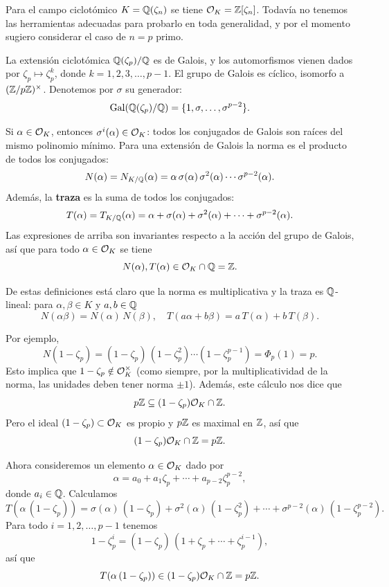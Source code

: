 \begin{ejemplo}
  Para el campo ciclotómico $K = \mathbb{Q} (\zeta_n)$ se tiene $\mathcal{O}_K = \mathbb{Z} [\zeta_n]$.
  Todavía no tenemos las herramientas adecuadas para probarlo en toda
  generalidad, y por el momento sugiero considerar el caso de $n = p$ primo.

  La extensión ciclotómica $\mathbb{Q} (\zeta_p)/\mathbb{Q}$ es de Galois, y los automorfismos
  vienen dados por $\zeta_p \mapsto \zeta_p^k$, donde $k = 1,2,3,\ldots,p-1$.
  El grupo de Galois es cíclico, isomorfo a $(\mathbb{Z}/p\mathbb{Z})^\times$. Denotemos por
  $\sigma$ su generador:
  $$\operatorname{Gal} (\mathbb{Q} (\zeta_p)/\mathbb{Q}) = \{ 1, \sigma, \ldots, \sigma^{p-2} \}.$$

  Si $\alpha \in \mathcal{O}_K$, entonces $\sigma^i (\alpha) \in \mathcal{O}_K$: todos los
  conjugados de Galois son raíces del mismo polinomio mínimo. Para una extensión
  de Galois la norma es el producto de todos los conjugados:
  \[ N (\alpha) = N_{K/\mathbb{Q}} (\alpha) =
     \alpha\,\sigma (\alpha)\,\sigma^2(\alpha)\cdots\sigma^{p-2}(\alpha). \]
  Además, la \textbf{traza} es la suma de todos los conjugados:
  \[ T (\alpha) = T_{K/\mathbb{Q}} (\alpha) =
     \alpha + \sigma (\alpha) + \sigma^2 (\alpha) + \cdots + \sigma^{p-2} (\alpha). \]
  Las expresiones de arriba son invariantes respecto a la acción del grupo de
  Galois, así que para todo $\alpha \in \mathcal{O}_K$ se tiene
  $$N (\alpha), T (\alpha) \in \mathcal{O}_K \cap \mathbb{Q} = \mathbb{Z}.$$

  De estas definiciones está claro que la norma es multiplicativa y la traza es
  $\mathbb{Q}$-lineal: para $\alpha,\beta \in K$ y $a,b \in \mathbb{Q}$
  \[ N (\alpha\beta) = N (\alpha) \, N (\beta), \quad
     T (a\alpha + b\beta) = a\,T (\alpha) + b\,T (\beta). \]

  Por ejemplo,
  \[ N (1 - \zeta_p) = (1 - \zeta_p)\,(1 - \zeta_p^2)\cdots (1 - \zeta_p^{p-1})
     = \Phi_p (1) = p. \]
  Esto implica que $1 - \zeta_p \notin \mathcal{O}_K^\times$ (como siempre, por la
  multiplicatividad de la norma, las unidades deben tener norma $\pm
  1$). Además, este cálculo nos dice que
  $$p\mathbb{Z} \subseteq (1 - \zeta_p) \mathcal{O}_K \cap \mathbb{Z}.$$
  Pero el ideal $(1 - \zeta_p) \subset \mathcal{O}_K$ es propio y $p\mathbb{Z}$ es maximal en
  $\mathbb{Z}$, así que
  $$(1-\zeta_p) \mathcal{O}_K \cap \mathbb{Z} = p\mathbb{Z}.$$

  Ahora consideremos un elemento $\alpha \in \mathcal{O}_K$ dado por
  $$\alpha = a_0 + a_1 \zeta_p + \cdots + a_{p-2} \zeta_p^{p-2},$$
  donde $a_i \in \mathbb{Q}$. Calculamos
  $$T (\alpha \, (1 - \zeta_p)) =
    \sigma (\alpha)\,(1 - \zeta_p) +
    \sigma^2 (\alpha)\,(1 - \zeta_p^2) +
    \cdots + 
    \sigma^{p-2} (\alpha)\,(1 - \zeta_p^{p-2}).$$
  Para todo $i = 1,2,\ldots,p-1$ tenemos
  $$1 - \zeta_p^i = (1 - \zeta_p)\,(1 + \zeta_p + \cdots + \zeta_p^{i-1}),$$
  así que
  $$T (\alpha \, (1 - \zeta_p)) \in (1 - \zeta_p) \mathcal{O}_K \cap \mathbb{Z} = p\mathbb{Z}.$$


\end{ejemplo}
